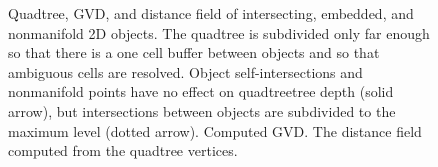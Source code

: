 \documentclass{egpubl}
\begin{document}
\begin{figure}
  \centering
  \caption{Quadtree, GVD, and distance field of intersecting, embedded, and nonmanifold 2D objects.
    \protect{} The quadtree is subdivided only far enough so that there is a one cell buffer between objects and so that ambiguous cells are resolved.  Object self-intersections and nonmanifold points have no effect on quadtreetree depth (solid arrow), but intersections between objects are subdivided to the maximum level (dotted arrow).
    \protect{} Computed GVD.
    \protect{} The distance field computed from the quadtree vertices.
  }
  \label{fig:predicate}
\end{figure}

%

\end{document}
